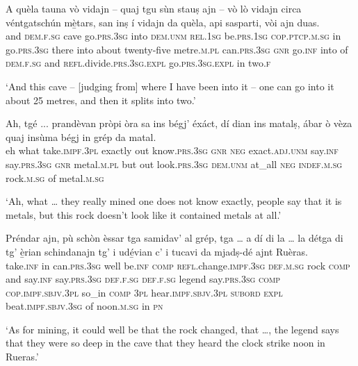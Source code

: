 \begin{linenumbers}
\gll A quèla tauna vò vidajn – quaj tgu sùn stauṣ ajn – vò lò vidajn circa véntgatschún mè̱tars, san inṣ\footnotemark {} í vidajn da quèla, api sasparti, vòi ajn duas.\\
and \textsc{dem.f.sg} cave go.\textsc{prs.3sg} into {}  \textsc{dem.unm} \textsc{rel.1sg} be.\textsc{prs.1sg} \textsc{cop.ptcp.m.sg} in {} go.\textsc{prs.3sg} there into about twenty-five metre.\textsc{m.pl} can.\textsc{prs.3sg} \textsc{gnr} go.\textsc{inf} into of \textsc{dem.f.sg} and \textsc{refl}.divide.\textsc{prs.3sg.expl} go.\textsc{prs.3sg.expl} in two.\textsc{f}  \\
\end{linenumbers}
\medskip
\glt `And this cave – [judging from] where I have been into it – one can go into it about 25 metres, and then it splits into two.'
\medskip

\begin{linenumbers}
\gll   Ah, tgé ... prandèvan pròpi òra sa ins bégj' éxáct, dí dian ins matalṣ, ábar ò vèza quaj insùma bégj in grép da matal. \\
eh what {} take.\textsc{impf.3pl} exactly out know.\textsc{prs.3sg} \textsc{gnr} \textsc{neg} exact.\textsc{adj.unm} say.\textsc{inf} say.\textsc{prs.3sg} \textsc{gnr}  metal.\textsc{m.pl} but out look.\textsc{prs.3sg} \textsc{dem.unm} at\_all \textsc{neg} \textsc{indef.m.sg} rock.\textsc{m.sg} of metal.\textsc{m.sg}\\
\end{linenumbers}
\medskip
\glt `Ah, what … they really mined one does not know exactly, people say that it is metals, but this rock doesn't look like it contained metals at all.'
\medskip

\begin{linenumbers}
\gll Préndar ajn, pù schòn èssar tga samidav’ al grép, tga …  a dí di la … la détga di tg’ è̱rian schindanajn tg' i udé̱vian c’ i tucavi da mjadṣ-dé ajnt Ruèras.\\
take.\textsc{inf} in can.\textsc{prs.3sg} well be.\textsc{inf} \textsc{comp} \textsc{refl}.change.\textsc{impf.3sg} \textsc{def.m.sg} rock \textsc{comp} {} and say.\textsc{inf} say.\textsc{prs.3sg} \textsc{def.f.sg} {} \textsc{def.f.sg} legend say.\textsc{prs.3sg}  \textsc{comp} \textsc{cop.impf.sbjv.3pl} so\_in \textsc{comp} \textsc{3pl} hear.\textsc{impf.sbjv.3pl} \textsc{subord} \textsc{expl} beat.\textsc{impf.sbjv.3sg} of noon.\textsc{m.sg} in \textsc{pn}\\
\end{linenumbers}
\medskip
\glt `As for mining, it could well be that the rock changed, that …, the legend says that they were so deep in the cave that they heard the clock strike noon in Rueras.'
\medskip

